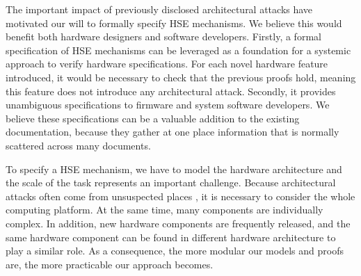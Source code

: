 The important impact of previously disclosed architectural attacks have
motivated our will to formally specify HSE mechanisms.
%
We believe this would benefit both hardware designers and software developers.
%
Firstly, a formal specification of HSE mechanisms can be leveraged as a
foundation for a systemic approach to verify hardware specifications.
%
For each novel hardware feature introduced, it would be necessary to check that
the previous proofs hold, meaning this feature does not introduce any
architectural attack.
%
Secondly, it provides unambiguous specifications to firmware and system software
developers.
%
We believe these specifications can be a valuable addition to the existing
documentation, because they gather at one place information that is normally
scattered across many documents. 

To specify a HSE mechanism, we have to model the hardware architecture and the
scale of the task represents an important challenge.
%
Because architectural attacks often come from unsuspected places , it is
necessary to consider the whole computing platform. At the same time, many
components are individually complex. 
%
In addition, new hardware components are frequently released, and the same
hardware component can be found in different hardware architecture to play a
similar role. 
%
As a consequence, the more modular our models and proofs are, the more
practicable our approach becomes.

